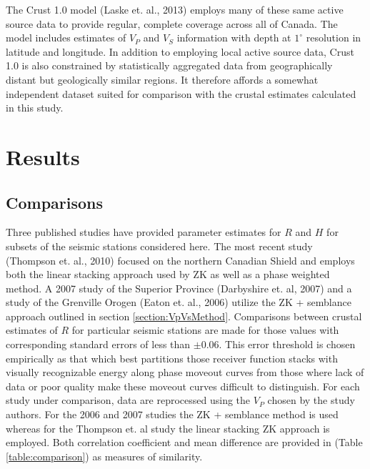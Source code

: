 \documentclass[review]{elsarticle}
\begin{document}
The Crust 1.0 model (Laske et. al., 2013) employs many of these same active source data to provide regular, complete coverage across all of Canada. The model includes estimates of $V_P$ and $V_S$ information with depth at $1^\circ$ resolution in latitude and longitude. In addition to employing local active source data, Crust 1.0 is also constrained by statistically aggregated data from geographically distant but geologically similar regions. It therefore affords a somewhat independent dataset suited for comparison with the crustal estimates calculated in this study.


\section{Results}


\subsection{Comparisons}

Three published studies have provided parameter estimates for $R$ and $H$ for subsets of the seismic stations considered here. The most recent study (Thompson et. al., 2010) focused on the northern Canadian Shield and employs both the linear stacking approach used by ZK as well as a phase weighted method. A 2007 study of the Superior Province (Darbyshire et. al, 2007) and a study of the Grenville Orogen (Eaton et. al., 2006) utilize the ZK + semblance approach outlined in section \ref{section:VpVsMethod}.  Comparisons between crustal estimates of $R$ for particular seismic stations are made for those values with corresponding standard errors of less than $\pm$0.06. This error threshold is chosen empirically as that which best partitions those receiver function stacks with visually recognizable energy along phase moveout curves from those where lack of data or poor quality make these moveout curves difficult to distinguish. For each study under comparison, data are reprocessed using the $V_P$ chosen by the study authors. For the 2006 and 2007 studies the ZK + semblance method is used whereas for the Thompson et. al study the linear stacking ZK approach is employed. Both correlation coefficient and mean difference are provided in (Table \ref{table:comparison}) as measures of similarity.
\end{document}
